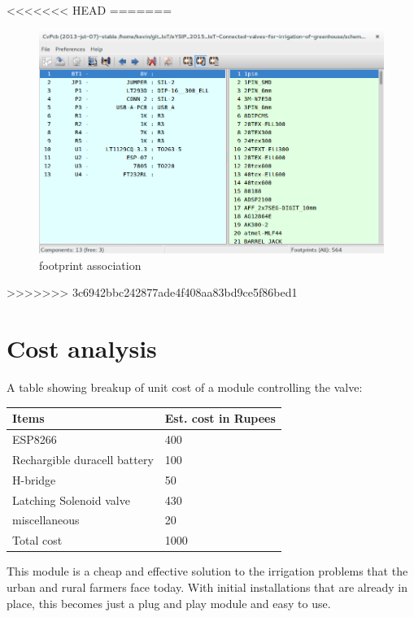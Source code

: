 \documentclass[16pt]{article}
\begin{document}
\hfill 


<<<<<<< HEAD
=======
\begin{figure}
\includegraphics[width=1\textwidth]{images/cvpcb.png}
\caption{footprint association}
\end{figure}

\vspace{10cm}


>>>>>>> 3c6942bbc242877ade4f408aa83bd9ce5f86bed1

\section{Cost analysis}

A table showing breakup of unit cost of a module controlling the valve: 

\vspace{0.5cm}
\begin{tabular}{|m{5cm}|m{3.5cm}|}
	\hline
	{\bf Items} & {\bf Est. cost in Rupees}\\ \hline
	ESP8266 & 400 \\ \hline
	Rechargible duracell battery & 100 \\ \hline
	H-bridge & 50 \\ \hline 
	Latching Solenoid valve & 430 \\ \hline
	miscellaneous & 20 \\ \hline
	Total cost & 1000 \\ \hline 
\end{tabular} 

\hfill 
\vspace{1cm}

This module is a cheap and effective solution to the irrigation problems that the urban and rural farmers face today.
With initial installations that are already in place, this becomes just a plug and play module and easy to use.\\
\end{document}

